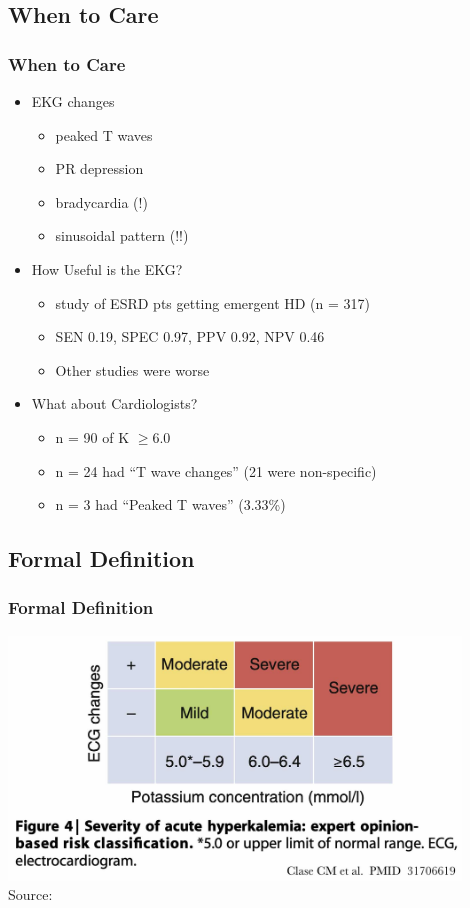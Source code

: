 \documentclass{beamer}
\begin{document}
\subsection{When to Care}
	\begin{frame}
		\frametitle{When to Care}
		\begin{itemize}
			\item EKG changes
			\pause
				\begin{itemize}
					\item peaked T waves
					\item PR depression
					\item bradycardia (!)
					\item sinusoidal pattern (!!)
				\end{itemize}
			\pause
			\item How Useful is the EKG?
			\pause
				\begin{itemize}
					\item study of ESRD pts getting emergent HD (n = 317)
					\item SEN 0.19, SPEC 0.97, PPV 0.92, NPV 0.46
					\item Other studies were worse 
				\end{itemize}
			\pause
			\item What about Cardiologists?
			\pause
			\begin{itemize}
				\item n = 90 of K $\geq$6.0
				\item n = 24 had ``T wave changes'' (21 were non-specific)
				\item n = 3 had ``Peaked T waves'' (3.33\%)
			\end{itemize}
		\end{itemize}
	\end{frame}
\subsection{Formal Definition}
\begin{frame}
\frametitle{Formal Definition}
	\centering
	\includegraphics[width=0.90\textwidth,keepaspectratio]{media/definition.jpg}
	\\
	\tiny{Source:}\footfullcite{Clase2020}
\end{frame}
\end{document}
